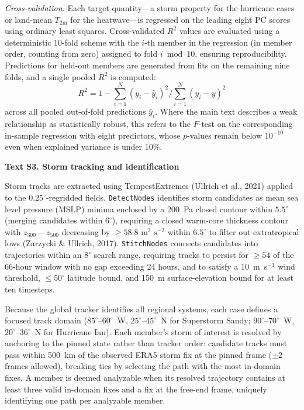 \noindent\textit{Cross-validation.} Each target quantity---a storm property for the hurricane cases or land-mean $T_{\mathrm{2m}}$ for the heatwave---is regressed on the leading eight PC scores using ordinary least squares. Cross-validated $R^2$ values are evaluated using a deterministic 10-fold scheme with the $i$-th member in the regression (in member order, counting from zero) assigned to fold $i \bmod 10$, ensuring reproducibility. Predictions for held-out members are generated from fits on the remaining nine folds, and a single pooled $R^2$ is computed:
\begin{equation}
R^{2} = 1 - \sum_{i=1}^{N} \left( y_{i} - \hat{y}_{i} \right)^{2} \Big/ \sum_{i=1}^{N} \left( y_{i} - \overline{y} \right)^{2}
\end{equation}
across all pooled out-of-fold predictions $\hat{y}_{i}$. Where the main text describes a weak relationship as statistically robust, this refers to the $F$-test on the corresponding in-sample regression with eight predictors, whose $p$-values remain below $10^{-10}$ even when explained variance is under 10\%.

\noindent\textbf{Text S3. Storm tracking and identification}

Storm tracks are extracted using TempestExtremes (Ullrich et al., 2021) applied to the $0.25^{\circ}$-regridded fields. \texttt{DetectNodes} identifies storm candidates as mean sea level pressure (MSLP) minima enclosed by a 200~Pa closed contour within $5.5^{\circ}$ (merging candidates within $6^{\circ}$), requiring a closed warm-core thickness contour with $z_{300}-z_{500}$ decreasing by $\ge 58.8\text{ m}^{2}\text{ s}^{-2}$ within $6.5^{\circ}$ to filter out extratropical lows (Zarzycki \& Ullrich, 2017). \texttt{StitchNodes} connects candidates into trajectories within an $8^{\circ}$ search range, requiring tracks to persist for $\ge 54$ of the 66-hour window with no gap exceeding 24 hours, and to satisfy a 10~m~s$^{-1}$ wind threshold, $\le 50^{\circ}$ latitude bound, and 150~m surface-elevation bound for at least ten timesteps.

Because the global tracker identifies all regional systems, each case defines a focused track domain ($85^{\circ}$--$60^{\circ}$~W, $25^{\circ}$--$45^{\circ}$~N for Superstorm Sandy; $90^{\circ}$--$70^{\circ}$~W, $20^{\circ}$--$36^{\circ}$~N for Hurricane Ian). Each member's storm of interest is resolved by anchoring to the pinned state rather than tracker order: candidate tracks must pass within 500~km of the observed ERA5 storm fix at the pinned frame ($\pm 2$ frames allowed), breaking ties by selecting the path with the most in-domain fixes. A member is deemed analyzable when its resolved trajectory contains at least three valid in-domain fixes and a fix at the free-end frame, uniquely identifying one path per analyzable member.

